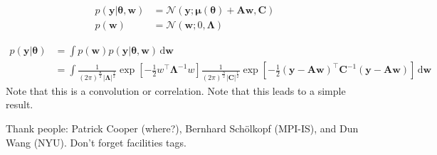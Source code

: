 \documentclass[modern]{rnaastex}
\newcommand{\dd}{\ensuremath{\,\mathrm{d}}}
\newcommand{\bvec}[1]{{\ensuremath{\boldsymbol{#1}}}}
\newcommand{\Gaussian}[3]{\ensuremath{\frac{1}{(2\pi)^\frac{#3}{2}|#2|^\frac{1}{2}} \exp\left[ -\frac{1}{2}#1^\top #2^{-1} #1 \right]}}
\begin{document}
\begin{align}
p(\bvec{y} | \bvec{\theta}, \bvec{w}) &= \mathcal{N}(\bvec{y}; \bvec{\mu}(\bvec{\theta}) + \bvec{A}\bvec{w}, \bvec{C}) \nonumber\\
%
p(\bvec{w}) &= \mathcal{N}(\bvec{w}; 0, \bvec{\Lambda}) \nonumber
\end{align}

\begin{align}
p(\bvec{y} | \bvec{\theta}) &= \int p(\bvec{w}) p(\bvec{y} | \bvec{\theta}, \bvec{w}) \dd\bvec{w} \\
&= \int \Gaussian{w}{\bvec{\Lambda}}{K} \Gaussian{(\bvec{y} - \bvec{A}\bvec{w})}{\bvec{C}}{N} \dd\bvec{w}
\end{align}
Note that this is a convolution or correlation. Note that this leads to a simple result.

\citep{Luger:2017,Luger:2016}

\acknowledgements
Thank people:
  Patrick Cooper (where?),
  Bernhard Sch\"olkopf (MPI-IS), and
  Dun Wang (NYU).
Don't forget facilities tags.


\end{document}
